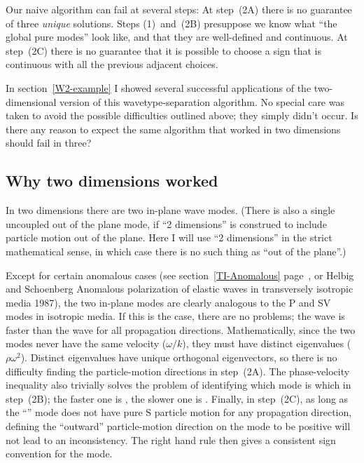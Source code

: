 Our naive algorithm can fail at several steps:
At step~(2A) there is no guarantee of three {\it unique} solutions.
Steps (1)~and~(2B) presuppose we know
what ``the global pure modes'' look like, and that they are
well-defined and continuous.
At step~(2C) there is no guarantee that it is possible
to choose a sign that is continuous with all the
previous adjacent choices.

In section~\ref{W2-example} I showed several
successful applications of the two-dimensional version of this
wavetype-separation algorithm.
No special care was taken to avoid the possible difficulties outlined
above; they simply didn't occur.
Is there any reason to expect the same algorithm that worked in
two dimensions should fail in three?

\subsection{Why two dimensions worked}
\label{Separ3-2DOK}
In two dimensions there are two in-plane wave modes.
(There is also a single uncoupled out of the plane mode,
if ``2 dimensions'' is construed to include particle
motion out of the plane. Here I will use ``2 dimensions'' in the
strict mathematical sense, in which case there is no such thing
as ``out of the plane''.)

Except for certain anomalous cases
(see section~\ref{TI-Anomalous} page~\pageref{TI-Anomalous},
or Helbig and Schoenberg
{Anomalous polarization of elastic waves in transversely isotropic media}
{1987}),
the two in-plane modes are clearly analogous to the P and SV modes
in isotropic media.
If this is the case, there are no problems;
the {\qP} wave is faster than
the {\qSV} wave for all propagation directions.
Mathematically, since the two modes never have the same velocity
($\omega / k$),
they must have distinct eigenvalues
($\rho \omega^2$).
Distinct eigenvalues have unique orthogonal eigenvectors,
so there is no difficulty finding the particle-motion directions
in step~(2A).
The phase-velocity inequality also trivially solves the
problem of identifying which mode is which in step~(2B);
the faster one is {\qP}, the slower one is {\qS}.
Finally, in step~(2C), as long as the ``{\qP}'' mode does not have
pure S particle motion for any propagation direction,
defining the ``outward'' particle-motion direction
on the {\qP} mode to be positive will not lead to
an inconsistency.
The right hand rule then
gives a consistent sign convention for the {\qSV} mode.

